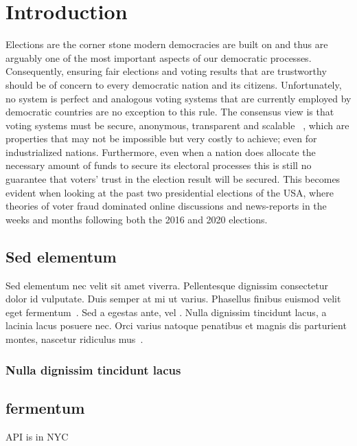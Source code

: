 \chapter{Introduction}
\label{ch:intro}

Elections are the corner stone modern democracies are built on and thus are arguably one of the most important aspects of our democratic processes.
Consequently, ensuring fair elections and voting results that are trustworthy should be of concern to every democratic nation and its citizens.
Unfortunately, no system is perfect and analogous voting systems that are currently employed by democratic countries are no exception to this rule.
The consensus view is that voting systems must be secure, anonymous, transparent and scalable~
\autocites{lowry_desirable_2009}[5]{agora_agora_nodate}[9-11]{jafar_blockchain_2021}, which are properties that may not be impossible but very costly to achieve;
even for industrialized nations.
Furthermore, even when a nation does allocate the necessary amount of funds to secure its electoral processes this is still no guarantee that voters' trust in the election result will be secured.
This becomes evident when looking at the past two presidential elections of the \Gls{USA}, where theories of voter fraud dominated online discussions and news-reports in the weeks and months following both the 2016 and 2020 elections.




\section{Sed elementum}\label{sec:sedelemntum}

Sed elementum nec velit sit amet viverra.
Pellentesque dignissim consectetur dolor id vulputate.
Duis semper at mi ut varius.
Phasellus finibus euismod velit eget fermentum~.
Sed a egestas ante, vel .
Nulla dignissim tincidunt lacus, a lacinia lacus posuere nec.
Orci varius natoque penatibus et magnis dis parturient montes, nascetur ridiculus mus~.

\subsection{Nulla dignissim tincidunt lacus}\label{subsec:nulladinissim}

\lipsum[1-10]

\section{fermentum}\label{sec:fermentum}

\lipsum[1-5]

\Gls{API} is in \Gls{NYC}


